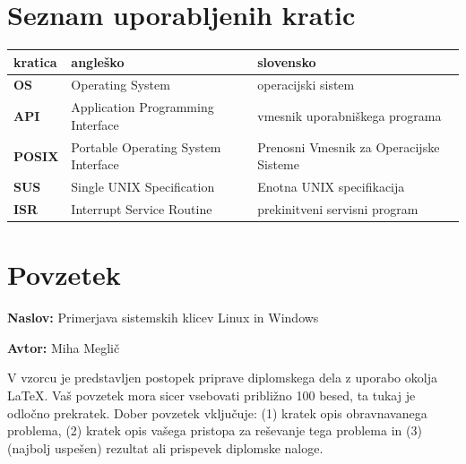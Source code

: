 \documentclass[a4paper,12pt,openright]{book}
\newcommand{\ttitle}{Primerjava sistemskih klicev Linux in Windows}
\newcommand{\tauthor}{Miha Meglič}
\newcommand{\clearemptydoublepage}{\newpage{\pagestyle{empty}\cleardoublepage}}
\begin{document}
\pagestyle{empty}
\def\thepage{}%
\tableofcontents{}


\clearemptydoublepage


\chapter*{Seznam uporabljenih kratic}

\noindent\begin{tabular}{p{}|p{}|p{}}    %
{\bf kratica} & {\bf angleško}                     & {\bf slovensko}                         \\
\hline
{\bf OS}      & Operating System                    & operacijski sistem                      \\
{\bf API}     & Application Programming Interface   & vmesnik uporabniškega programa          \\
{\bf POSIX}   & Portable Operating System Interface & Prenosni Vmesnik za Operacijske Sisteme \\
{\bf SUS}     & Single UNIX Specification           & Enotna UNIX specifikacija               \\
{\bf ISR}     & Interrupt Service Routine           & prekinitveni servisni program           \\
\end{tabular}


\clearemptydoublepage

\chapter*{Povzetek}

\noindent\textbf{Naslov:} \ttitle
\bigskip

\noindent\textbf{Avtor:} \tauthor
\bigskip

\noindent V vzorcu je predstavljen postopek priprave diplomskega dela z uporabo okolja \LaTeX. Vaš povzetek mora sicer vsebovati približno 100 besed, ta tukaj je odločno prekratek.
Dober povzetek vključuje: (1) kratek opis obravnavanega problema, (2) kratek opis vašega pristopa za reševanje tega problema in (3) (najbolj uspešen) rezultat ali prispevek diplomske naloge.
\end{document}

